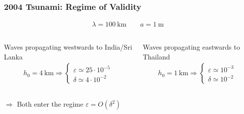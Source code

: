 \documentclass[fleqn]{beamer}
\begin{document}
    \begin{frame}
        \frametitle{2004 Tsunami: Regime of Validity}
        \begin{ceqn}
        \begin{align}
            \lambda = 100\ \text{km}\qquad a = 1\ \text{m}\nonumber
        \end{align}
        \end{ceqn}
        \begin{columns}
            Waves propagating westwards to India/Sri Lanka
            \begin{align}
            h_0 = 4\ \text{km} \Rightarrow
            \begin{cases}
                \varepsilon \simeq 25 \cdot 10^{-5}\\
                \delta \simeq 4\cdot 10^{-2}
            \end{cases}\nonumber
            \end{align}

            Waves propagating eastwards to Thailand
            \begin{align}
            h_0 = 1\ \text{km} \Rightarrow
            \begin{cases}
                \varepsilon \simeq 10^{-3}\\
                \delta \simeq 10^{-2}
            \end{cases}\nonumber
            \end{align}
        \end{columns}
        \vspace{0.5cm}
        \centering
        $\Rightarrow$ Both enter the regime $\varepsilon = O(\delta^2)$
    \end{frame}
\end{document}
